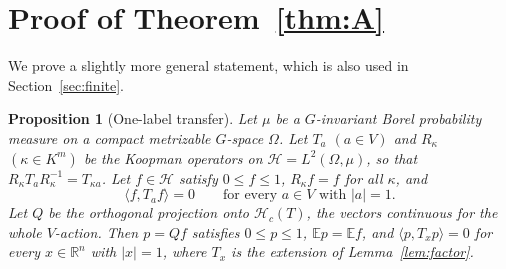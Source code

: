 \documentclass[11pt]{amsart}
\newtheorem{proposition}[theorem]{Proposition}
\theoremstyle{definition}
\newcommand{\R}{\mathbb{R}}
\newcommand{\cH}{\mathcal{H}}
\newcommand{\E}{\mathbb{E}}
\begin{document}
\section{Proof of Theorem~\ref{thm:A}}\label{sec:proofA}

We prove a slightly more general statement, which is also used in Section~\ref{sec:finite}.

\begin{proposition}[One-label transfer]\label{prop:onelabel}
Let $\mu$ be a $G$-invariant Borel probability measure on a compact metrizable $G$-space $\Omega$. Let $T_a$ $(a\in V)$ and $R_\kappa$ $(\kappa\in K^m)$ be the Koopman operators on $\cH=L^2(\Omega,\mu)$, so that $R_\kappa T_aR_\kappa^{-1}=T_{\kappa a}$. Let $f\in\cH$ satisfy $0\le f\le 1$, $R_\kappa f=f$ for all $\kappa$, and
\[
\langle f,T_af\rangle=0\qquad\text{for every }a\in V\text{ with }|a|=1 .
\]
Let $Q$ be the orthogonal projection onto $\cH_c(T)$, the vectors continuous for the whole $V$-action. Then $p=Qf$ satisfies $0\le p\le 1$, $\E p=\E f$, and $\langle p,T_xp\rangle=0$ for every $x\in\R^n$ with $|x|=1$, where $T_x$ is the extension of Lemma~\ref{lem:factor}.
\end{proposition}
\end{document}
